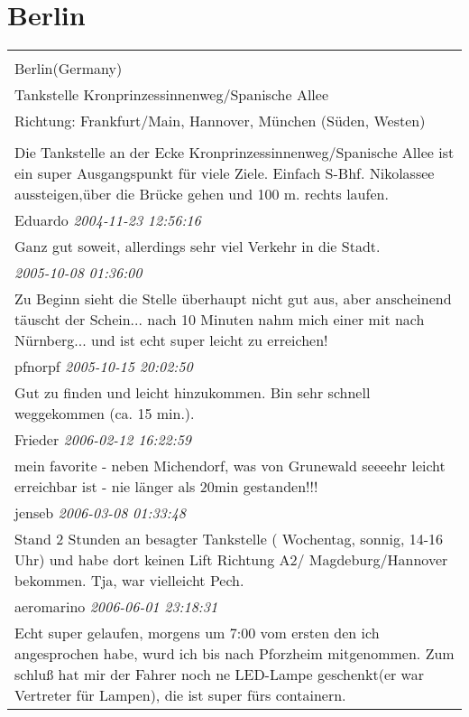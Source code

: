 \documentclass[a4paper,12pt]{article}
\begin{document}
\section{Berlin}
\begin{tabular}{|p{13cm}|}
\hline\\
Berlin(Germany)\\
Tankstelle Kronprinzessinnenweg/Spanische Allee\\
Richtung: Frankfurt/Main, Hannover, München (Süden, Westen) \\
\hline\\
Die Tankstelle an der Ecke Kronprinzessinnenweg/Spanische Allee ist ein super Ausgangspunkt für viele Ziele. Einfach S-Bhf. Nikolassee aussteigen,über die Brücke gehen und 100 m. rechts laufen. \\
Eduardo \textit{ 2004-11-23 12:56:16 }\\\hline Ganz gut soweit, allerdings sehr viel Verkehr in die Stadt. \\
\textit{ 2005-10-08 01:36:00 }\\\hline Zu Beginn sieht die Stelle überhaupt nicht gut aus, aber anscheinend täuscht der Schein... nach 10 Minuten nahm mich einer mit nach Nürnberg... und ist echt super leicht zu erreichen! \\
pfnorpf \textit{ 2005-10-15 20:02:50 }\\\hline Gut zu finden und leicht hinzukommen. Bin sehr schnell weggekommen (ca. 15 min.). \\
Frieder \textit{ 2006-02-12 16:22:59 }\\\hline mein favorite - neben Michendorf, was von Grunewald seeeehr leicht erreichbar ist - nie länger als 20min gestanden!!! \\
jenseb \textit{ 2006-03-08 01:33:48 }\\\hline Stand 2 Stunden an besagter Tankstelle ( Wochentag, sonnig, 14-16 Uhr) und habe dort keinen Lift Richtung A2/ Magdeburg/Hannover bekommen. Tja, war vielleicht Pech. \\
aeromarino \textit{ 2006-06-01 23:18:31 }\\\hline Echt super gelaufen, morgens um 7:00 vom ersten den ich angesprochen habe, wurd ich bis nach Pforzheim mitgenommen.
Zum schluß hat mir der Fahrer noch ne LED-Lampe geschenkt(er war Vertreter für Lampen), die ist super fürs containern.


\end{tabular}
\end{document}
